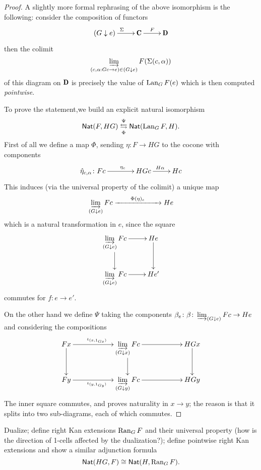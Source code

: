 \documentclass[a4paper,12pt]{amsart}
\begin{document}
\begin{proof}
A slightly more formal rephrasing of the above isomorphism is the following: consider the composition of functors
\[
\xymatrix{
	(G\downarrow e) \ar[r]^\Sigma & \C \ar[r]^F & \D
}
\]
then the colimit
\[
\varinjlim_{(c, \alpha : Gc \to e)\in(G\downarrow e)} F(\Sigma(c, \alpha))
\]
of this diagram on $\D$ is precisely the value of $\operatorname{Lan}_GF(e)$ which is then computed \emph{pointwise}.

To prove the statement,we build an explicit natural isomorphism
\[
\textsf{Nat}(F,HG)\overset{\Psi}{\underset{\Phi}\leftrightarrows} \textsf{Nat}(\operatorname{Lan}_GF,H).
\]
First of all we define a map $\Phi$, sending $\eta\colon F \to HG$ to the cocone with components
\[
\xymatrix{
	**[l] \hat{\eta}_{c,\alpha} \colon Fc \ar[r]^{\eta_c} & HGc \ar[r]^{H\alpha} & Hc
}
\]
This induces (via the universal property of the colimit) a unique map
\[
\varinjlim_{(G\downarrow e)} Fc \xrightarrow[]{\qquad \Phi(\eta)_e\qquad} He
\]
which is a natural transformation in $e$, since the square
\[
\xymatrix{
	\displaystyle \varinjlim_{(G\downarrow e)} Fc \ar[r]\ar[d]& He \ar[d]\\
	\displaystyle \varinjlim_{(G\downarrow e)} Fc \ar[r] & He'
}
\]
commutes for $f\colon e\to e'$.

On the other hand we define $\Psi$ taking the components $\beta_e \colon \beta\colon \varinjlim_{(G\downarrow e)} Fc \to He$ and considering the compositions
\[
\xymatrix@C=2cm{
	Fx\ar[r]^{\iota_{(x, 1_{Gx})}}\ar[d] & \displaystyle\varinjlim_{(G\downarrow x)} Fc \ar[r]\ar[d] & HGx \ar[d] \\
	Fy \ar[r]_{\iota_{(y, 1_{Gy})}}& \displaystyle\varinjlim_{(G\downarrow y)} Fc \ar[r] & HGy 
}
\]
The inner square commutes, and proves naturality in $x\to y$; the reason is that it splits into two sub-diagrams, each of which commutes.
\end{proof}
\begin{exercise}
Dualize; define right Kan extensions $\operatorname{Ran}_GF$ and their universal property (how is the direction of 1-cells affected by the dualization?); define pointwise right Kan extensions and show a similar adjunction formula
\[
\textsf{Nat}(HG,F)\cong \textsf{Nat}(H, \operatorname{Ran}_GF).
\]
\end{exercise}
\end{document}
